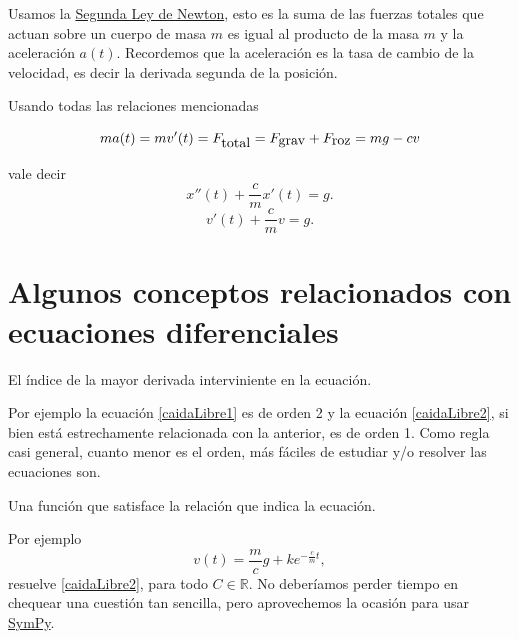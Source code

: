 \documentclass{article}
\newcommand{\rr}{\mathbb{R}}
\newcounter{ejemplo_cont}
\begin{document}
 Usamos la \href{http://es.wikipedia.org/wiki/Leyes_de_Newton}{Segunda Ley de Newton}, esto es la suma de las fuerzas totales que actuan sobre un cuerpo de masa $m$
es igual al producto de la masa $m$ y la aceleración $a(t)$. Recordemos que la aceleración es la tasa de cambio de la velocidad, es decir la derivada segunda de la posición.   

  Usando todas las relaciones mencionadas

\[ma(t)=mv'(t)=F_{\hbox{total}}=F_{\hbox{grav}}+F_{\hbox{roz}}=mg-cv\]

vale decir
\begin{equation}\label{caidaLibre1}
 \boxed{ x''(t)+\frac{c}{m} x'(t)=g.}
\end{equation}
\begin{equation}\label{caidaLibre2}
\boxed{ v'(t)+\frac{c}{m} v=g.}
\end{equation}





\section{Algunos conceptos relacionados con ecuaciones diferenciales}

\begin{definicion}[Orden] El índice de la mayor derivada interviniente en la ecuación.
 \end{definicion}

 Por ejemplo la ecuación \eqref{caidaLibre1} es de orden 2 y la
ecuación \eqref{caidaLibre2}, si bien está estrechamente relacionada con la anterior, es de orden 1. Como regla casi general, cuanto menor es el orden,  más fáciles de estudiar y/o resolver las ecuaciones son.

  \begin{definicion}[Solución] Una función que satisface la relación que indica la ecuación.

   \end{definicion}

   Por ejemplo
\begin{equation}\label{SolGencaidaLibre2} v(t)=\frac{m}{c}g+ke^{-\frac{c}{m}t},\end{equation}
resuelve \eqref{caidaLibre2}, para todo $C\in\rr$. No deberíamos perder tiempo en chequear una cuestión tan sencilla, pero aprovechemos la ocasión para usar  \href{http://www.sympy.org}{SymPy}.
\end{document}
